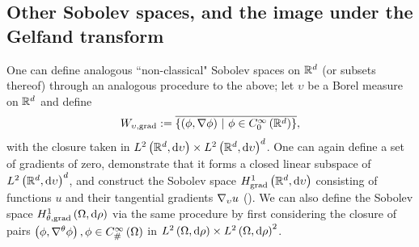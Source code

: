 \subsection{Other Sobolev spaces, and the image under the Gelfand transform} \label{ssec:SobSpacesAndGelfand}
One can define analogous ``non-classical" Sobolev spaces on $\mathbb{R}^d$ (or subsets thereof) through an analogous procedure to the above; let $\upsilon$ be a Borel measure on $\mathbb{R}^d$ and define
\begin{align*}
	W_{\upsilon,\mathrm{grad}} := \overline{ \left\{  \left( \phi, \nabla\phi \right) \ \middle\vert \  \phi\in C^{\infty}_{0}\left( \mathbb{R}^d \right)  \right\} },
\end{align*}
with the closure taken in $L^{2}\left( \mathbb{R}^d,\mathrm{d} \upsilon \right)\times L^{2}\left( \mathbb{R}^d,\mathrm{d} \upsilon \right)^d$.
One can again define a set of gradients of zero, demonstrate that it forms a closed linear subspace of $L^{2}\left( \mathbb{R}^d,\mathrm{d} \upsilon \right)^d$, and construct the Sobolev space $H^1_\mathrm{grad}\left( \mathbb{R}^d, \mathrm{d}\upsilon \right)$ consisting of functions $u$ and their tangential gradients $\nabla_{\upsilon}u$ (\cite[section 5]{zhikov2002homogenization}).
We can also define the Sobolev space $H^1_{\theta, \mathrm{grad}}\left( \Omega, \mathrm{d}\rho \right)$ via the same procedure by first considering the closure of pairs $\left( \phi, \nabla^{\theta}\phi \right), \phi\in C^{\infty}_{\#}\left( \Omega \right)$ in $L^{2}\left( \Omega,\mathrm{d} \rho \right)\times L^{2}\left( \Omega,\mathrm{d} \rho \right)^2$.

